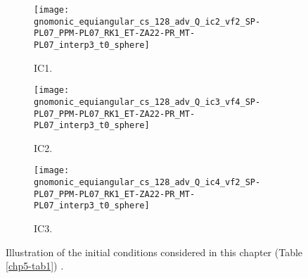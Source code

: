 \begin{figure}[!htb]
	\centering
	\begin{subfigure}{0.3\textwidth}
		\centering
		\texttt{[image: gnomonic\_equiangular\_cs\_128\_adv\_Q\_ic2\_vf2\_SP-PL07\_PPM-PL07\_RK1\_ET-ZA22-PR\_MT-PL07\_interp3\_t0\_sphere]}
		\caption{IC1. \label{chp5-ic1}}
	\end{subfigure}
	\begin{subfigure}{0.3\textwidth}
		\centering
		\texttt{[image: gnomonic\_equiangular\_cs\_128\_adv\_Q\_ic3\_vf4\_SP-PL07\_PPM-PL07\_RK1\_ET-ZA22-PR\_MT-PL07\_interp3\_t0\_sphere]}
		\caption{IC2. \label{chp5-ic2}}
	\end{subfigure}
	\begin{subfigure}{0.3\textwidth}
		\centering
		\texttt{[image: gnomonic\_equiangular\_cs\_128\_adv\_Q\_ic4\_vf2\_SP-PL07\_PPM-PL07\_RK1\_ET-ZA22-PR\_MT-PL07\_interp3\_t0\_sphere]}
		\caption{IC3. \label{chp5-ic3}}
	\end{subfigure}
	\caption{ Illustration of the initial conditions considered in this chapter (Table \ref{chp5-tab1}) .\label{chp5-ic}}
\end{figure}

